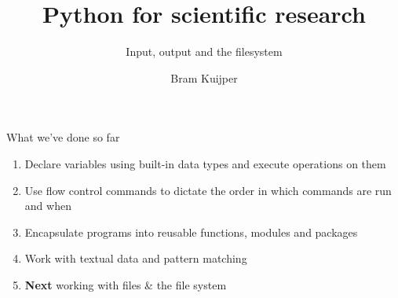 \documentclass[xcolor=table]{beamer}
\title[Python for scientific research]{Python for scientific research}
\subtitle{Input, output and the filesystem}
\author{Bram Kuijper}
\institute[]{University of Exeter, Penryn Campus, UK}
\begin{document}
\begin{frame}
\titlepage
\end{frame}

\begin{frame}{What we've done so far}
	\begin{enumerate}\addtolength{\itemsep}{1\baselineskip}
		\item Declare variables using built-in data types and execute operations
		on them
		\item Use flow control commands to dictate the order in which commands are run
		and when
		\item Encapsulate programs into reusable functions, modules and packages
        \item Work with textual data and pattern matching
        \item \textbf{Next} working with files \& the file system 
	\end{enumerate}

\end{frame}

\end{document}
